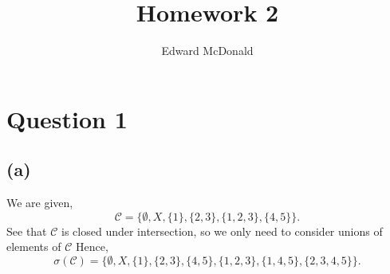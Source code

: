 \documentclass{unswmaths}
\begin{document}
\subject{Measure Theory}
\author{Edward McDonald}
\title{Homework 2}


\setlength\parindent{0pt}


\newcommand{\Bor}{\mathcal{B}(\Rl)}


\unswtitle{}


\section*{Question 1}
\subsection*{(a)}
    We are given,
    \begin{equation*}
        \mathcal{C} = \{\emptyset, X, \{1\},\{2,3\},\{1,2,3\},\{4,5\}\}.
    \end{equation*}
    See that $\mathcal{C}$ is closed under intersection, so we only
    need to consider unions of elements of $\mathcal{C}$
    Hence, 
    \begin{equation*}
        \sigma(\mathcal{C}) = \{\emptyset, X, \{1\},\{2,3\},\{4,5\},\{1,2,3\},\{1,4,5\},\{2,3,4,5\}\}.
    \end{equation*}
    
    
\end{document}
